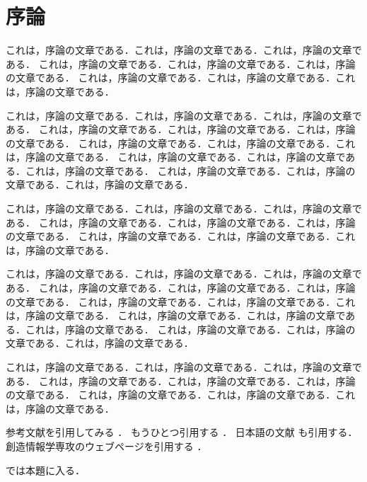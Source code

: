 \chapter{序論} \label{chap:intro}

これは，序論の文章である．これは，序論の文章である．これは，序論の文章である．
これは，序論の文章である．これは，序論の文章である．これは，序論の文章である．
これは，序論の文章である．これは，序論の文章である．これは，序論の文章である．

これは，序論の文章である．これは，序論の文章である．これは，序論の文章である．
これは，序論の文章である．これは，序論の文章である．これは，序論の文章である．
これは，序論の文章である．これは，序論の文章である．これは，序論の文章である．
これは，序論の文章である．これは，序論の文章である．これは，序論の文章である．
これは，序論の文章である．これは，序論の文章である．これは，序論の文章である．

これは，序論の文章である．これは，序論の文章である．これは，序論の文章である．
これは，序論の文章である．これは，序論の文章である．これは，序論の文章である．
これは，序論の文章である．これは，序論の文章である．これは，序論の文章である．

これは，序論の文章である．これは，序論の文章である．これは，序論の文章である．
これは，序論の文章である．これは，序論の文章である．これは，序論の文章である．
これは，序論の文章である．これは，序論の文章である．これは，序論の文章である．
これは，序論の文章である．これは，序論の文章である．これは，序論の文章である．
これは，序論の文章である．これは，序論の文章である．これは，序論の文章である．

これは，序論の文章である．これは，序論の文章である．これは，序論の文章である．
これは，序論の文章である．これは，序論の文章である．これは，序論の文章である．
これは，序論の文章である．これは，序論の文章である．これは，序論の文章である．

参考文献を引用してみる \cite{92795,Knuth86}．
もうひとつ引用する \cite{BollenHHJ07}．
日本語の文献 \cite{Okumura07,ON06} も引用する．
創造情報学専攻のウェブページを引用する \cite{CI08}．

では本題に入る．
